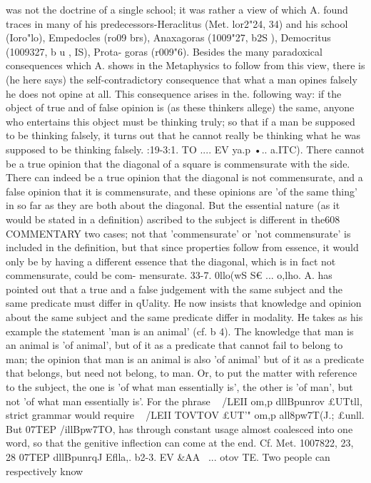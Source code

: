 {{{{{{{{{{{{{{{{{{{{{{{{{{{{{{{{{{{{{{{was not the doctrine of a single school; it was rather a view of
which A. found traces in many of his predecessors-Heraclitus
(Met. lor2"24, 34) and his school (Ioro"lo), Empedocles (ro09 brs),
Anaxagoras (1009"27, b2S ), Democritus (1009327, b u , IS), Prota-
goras (r009"6).
Besides the many paradoxical consequences which A. shows in
the Metaphysics to follow from this view, there is (he here says)
the self-contradictory consequence that what a man opines
falsely he does not opine at all. This consequence arises in the.
following way: if the object of true and of false opinion is (as
these thinkers allege) the same, anyone who entertains this object
must be thinking truly; so that if a man be supposed to be
thinking falsely, it turns out that he cannot really be thinking
what he was supposed to be thinking falsely.
:19-3:1. TO .... EV ya.p •.. a.{ITC). There cannot be a true opinion
that the diagonal of a square is commensurate with the side.
There can indeed be a true opinion that the diagonal is not
commensurate, and a false opinion that it is commensurate, and
these opinions are 'of the same thing' in so far as they are both
about the diagonal. But the essential nature (as it would be
stated in a definition) ascribed to the subject is different in the608
COMMENTARY
two cases; not that 'commensurate' or 'not commensurate' is
included in the definition, but that since properties follow from
essence, it would only be by having a different essence that the
diagonal, which is in fact not commensurate, could be com-
mensurate.
33-7. 0llo(wS S€ ... o,lho. A. has pointed out that a true and
a false judgement with the same subject and the same predicate
must differ in qUality. He now insists that knowledge and opinion
about the same subject and the same predicate differ in modality.
He takes as his example the statement 'man is an animal' (cf.
b 4). The knowledge that man is an animal is 'of animal', but of
it as a predicate that cannot fail to belong to man; the opinion
that man is an animal is also 'of animal' but of it as a predicate
that belongs, but need not belong, to man. Or, to put the matter
with reference to the subject, the one is 'of what man essentially
is', the other is 'of man', but not 'of what man essentially is'.
For the phrase ~ /LEII om,p dllBpunrov £UTtll, strict grammar would
require ~ /LEII TOVTOV £UT'" om,p all8pw7T(J.; £unll. But 07TEP /illBpw7TO,
has through constant usage almost coalesced into one word, so
that the genitive inflection can come at the end. Cf. Met. 1007822,
23, 28 07TEP dllBpunrqJ Eflla,.
b2-3. EV &AA~ ... otov TE. Two people can respectively know
}}}}}}}}}}}}}}}}}}}}}}}}}}}}}}}}}}}}}}}}
